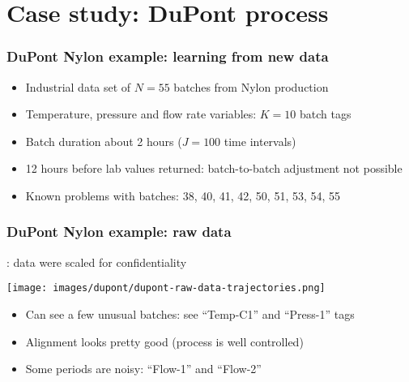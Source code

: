 
\section{Case study: DuPont process}

\begin{frame}\frametitle{DuPont Nylon example: learning from new data}

	\begin{itemize}
		\item	Industrial data set of \( N = 55 \) batches from Nylon production
		
		\item	Temperature, pressure and flow rate variables: \( K = 10\)  batch tags
		
		\item	Batch duration about 2 hours (\( J=100 \) time intervals)
		
		\item	12 hours before lab values returned: batch-to-batch adjustment not possible
		
		\item	Known problems with batches: 38, 40, 41, 42, 50, 51, 53, 54, 55
	\end{itemize}
	
	
\end{frame}

\begin{frame}\frametitle{DuPont Nylon example: raw data}
	{\color{myGreen}{Note}}: data were scaled for confidentiality
	\begin{center}
		\texttt{[image: images/dupont/dupont-raw-data-trajectories.png]}
	\end{center}
	
	\vspace{1cm}
	\begin{itemize}
		\item	Can see a few unusual batches: see ``Temp-C1'' and ``Press-1'' tags
		
		\item	Alignment looks pretty good (process is well controlled)
		
		\item	Some periods are noisy: ``Flow-1'' and ``Flow-2''
	\end{itemize}
\end{frame}

